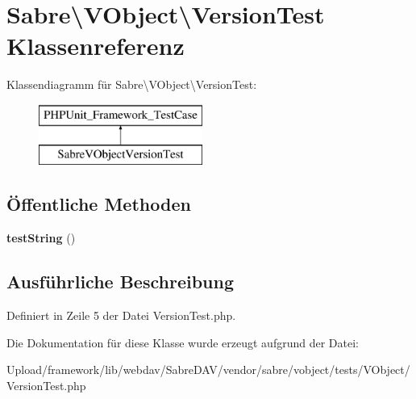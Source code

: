 \hypertarget{class_sabre_1_1_v_object_1_1_version_test}{}\section{Sabre\textbackslash{}V\+Object\textbackslash{}Version\+Test Klassenreferenz}
\label{class_sabre_1_1_v_object_1_1_version_test}
Klassendiagramm für Sabre\textbackslash{}V\+Object\textbackslash{}Version\+Test\+:\begin{figure}[H]
\begin{center}
\leavevmode
\includegraphics[height=2.000000cm]{class_sabre_1_1_v_object_1_1_version_test}
\end{center}
\end{figure}
\subsection*{Öffentliche Methoden}
\begin{DoxyCompactItemize}
\item 
\mbox{\label{class_sabre_1_1_v_object_1_1_version_test_aa5117dcc9c1c155b6f2bf691e43b5ff2}} 
{\bfseries test\+String} ()
\end{DoxyCompactItemize}


\subsection{Ausführliche Beschreibung}


Definiert in Zeile 5 der Datei Version\+Test.\+php.



Die Dokumentation für diese Klasse wurde erzeugt aufgrund der Datei\+:\begin{DoxyCompactItemize}
\item 
Upload/framework/lib/webdav/\+Sabre\+D\+A\+V/vendor/sabre/vobject/tests/\+V\+Object/Version\+Test.\+php\end{DoxyCompactItemize}
